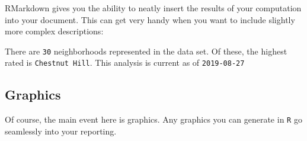 \documentclass[]{article}
\newenvironment{Shaded}{\begin{snugshade}}{\end{snugshade}}
\newcommand{\DataTypeTok}[1]{\textcolor[rgb]{0.13,0.29,0.53}{#1}}
\newcommand{\KeywordTok}[1]{\textcolor[rgb]{0.13,0.29,0.53}{\textbf{#1}}}
\newcommand{\NormalTok}[1]{#1}
\newcommand{\OperatorTok}[1]{\textcolor[rgb]{0.81,0.36,0.00}{\textbf{#1}}}
\newcommand{\StringTok}[1]{\textcolor[rgb]{0.31,0.60,0.02}{#1}}
\begin{document}
RMarkdown gives you the ability to neatly insert the results of your
computation into your document. This can get very handy when you want to
include slightly more complex descriptions:

\begin{Shaded}
\end{Shaded}

There are \texttt{30} neighborhoods represented in the data set. Of
these, the highest rated is \texttt{Chestnut\ Hill}. This analysis is
current as of \texttt{2019-08-27}

\hypertarget{graphics}{%
\subsection{Graphics}\label{graphics}}

Of course, the main event here is graphics. Any graphics you can
generate in \texttt{R} go seamlessly into your reporting.

\begin{Shaded}
\end{Shaded}
\end{document}
